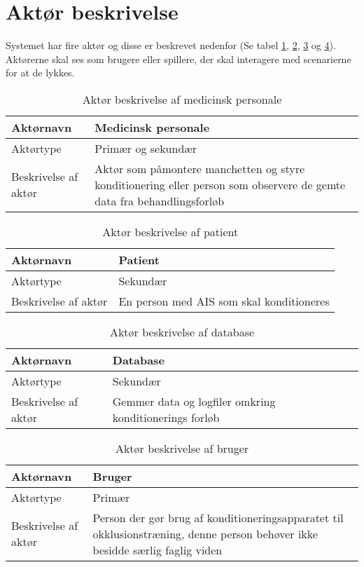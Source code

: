 	\newpage
	\section{Aktør beskrivelse}
	Systemet har fire aktør og disse er beskrevet nedenfor (Se tabel \ref{tab:medi}, \ref{tab:patient}, \ref{tab:data} og \ref{tab:bruger}). Aktørerne skal ses som brugere eller spillere, der skal interagere med scenarierne for at de lykkes. 
	
	\begin{table}[H]
		\centering
		\begin{tabular}{ | p{} | p{}| } 
			\hline
			Aktørnavn& Medicinsk personale  \\ 
			\hline
			Aktørtype & Primær og sekundær \\ 
			\hline
			Beskrivelse af aktør & Aktør som påmontere manchetten og styre konditionering eller person som observere de gemte data fra behandlingsforløb\\ 
			\hline
		\end{tabular}
		\caption{Aktør beskrivelse af medicinsk personale} \label{tab:medi}
	\end{table}
	
	\begin{table}[H]
		\centering
		\begin{tabular}{ | p{} | p{}| } 
			\hline
			Aktørnavn& Patient \\ 
			\hline
			Aktørtype & Sekundær \\ 
			\hline
			Beskrivelse af aktør & En person med AIS som skal konditioneres\\ 
			\hline
		\end{tabular}
		\caption{Aktør beskrivelse af patient} \label{tab:patient}
	\end{table}
	
	\begin{table}[H]
		\centering
		\begin{tabular}{ | p{} | p{}| } 
			\hline
			Aktørnavn& Database \\ 
			\hline
			Aktørtype & Sekundær \\ 
			\hline
			Beskrivelse af aktør & Gemmer data og logfiler omkring konditionerings forløb\\ 
			\hline
		\end{tabular}
		\caption{Aktør beskrivelse af database} \label{tab:data}
	\end{table}
	
	\begin{table}[H]
		\centering
		\begin{tabular}{ | p{} | p{}| } 
			\hline
			Aktørnavn& Bruger \\ 
			\hline
			Aktørtype & Primær \\ 
			\hline
			Beskrivelse af aktør & Person der gør brug af konditioneringsapparatet til okklusionstræning, denne person behøver ikke besidde særlig faglig viden \\ 
			\hline
		\end{tabular}
		\caption{Aktør beskrivelse af bruger} \label{tab:bruger}
	\end{table}